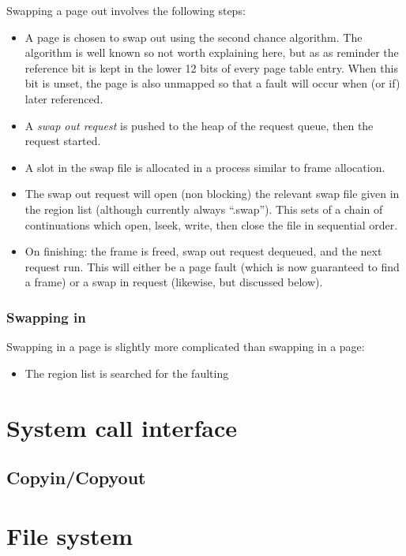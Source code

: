 \documentclass[12pt,english]{article}
\begin{document}
Swapping a page out involves the following steps:
\begin{itemize}
\item A page is chosen to swap out using the second chance algorithm.  The algorithm is well known so not worth explaining here, but as as reminder the reference bit is kept in the lower 12 bits of every page table entry.  When this bit is unset, the page is also unmapped so that a fault will occur when (or if) later referenced.
\item A \emph{swap out request} is pushed to the heap of the request queue, then the request started.
\item A slot in the swap file is allocated in a process similar to frame allocation.
\item The swap out request will open (non blocking) the relevant swap file given in the region list (although currently always ``.swap'').  This sets of a chain of continuations which open, lseek, write, then close the file in sequential order.
\item On finishing: the frame is freed, swap out request dequeued, and the next request run.  This will either be a page fault (which is now guaranteed to find a frame) or a swap in request (likewise, but discussed below).
\end{itemize}

\subsubsection{Swapping in}

Swapping in a page is slightly more complicated than swapping in a page:
\begin{itemize}
\item The region list is searched for the faulting 
\end{itemize}


\section{System call interface}

\subsection{Copyin/Copyout}


\section{File system}
\end{document}
